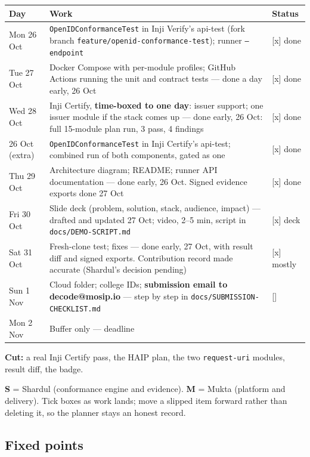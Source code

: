 \documentclass[10pt,a4paper]{article}
\newcommand{\done}{[x]}
\newcommand{\todo}{[\phantom{x}]}
\newcommand{\Sh}{\textbf{S}}
\newcommand{\Mu}{\textbf{M}}
\begin{document}
\begin{longtable}{@{}p{2.2cm}p{11.2cm}p{2.6cm}@{}}
\toprule
Day & Work & Status\\
\midrule
\endhead
Mon 26 Oct & \texttt{OpenIDConformanceTest} in Inji Verify's api-test (fork branch
\texttt{feature/openid-conformance-test}); runner \texttt{--endpoint} & \done{} done\\
Tue 27 Oct & Docker Compose with per-module profiles; GitHub Actions running the unit and
contract tests --- done a day early, 26 Oct & \done{} done\\
Wed 28 Oct & Inji Certify, \textbf{time-boxed to one day}: issuer support; one issuer module
if the stack comes up --- done early, 26 Oct: full 15-module plan run, 3 pass, 4 findings & \done{} done\\
26 Oct (extra) & \texttt{OpenIDConformanceTest} in Inji Certify's api-test; combined run of both
components, gated as one & \done{} done\\
Thu 29 Oct & Architecture diagram; README; runner API documentation --- done early, 26 Oct.
Signed evidence exports done 27 Oct & \done{} done\\
Fri 30 Oct & Slide deck (problem, solution, stack, audience, impact) --- drafted and updated 27 Oct; video, 2--5 min, script in \texttt{docs/DEMO-SCRIPT.md} & \done{} deck\\
Sat 31 Oct & Fresh-clone test; fixes --- done early, 27 Oct, with result diff and signed exports. Contribution record made accurate (Shardul's decision pending) & \done{} mostly\\
Sun 1 Nov & Cloud folder; college IDs; \textbf{submission email to decode@mosip.io} --- step by step in \texttt{docs/SUBMISSION-CHECKLIST.md} & \todo{}\\
Mon 2 Nov & Buffer only --- deadline & \\
\bottomrule
\end{longtable}

\textbf{Cut:} a real Inji Certify pass, the HAIP plan, the two \texttt{request-uri} modules,
result diff, the badge.

\Sh{} = Shardul (conformance engine and evidence). \Mu{} = Mukta (platform and delivery).
Tick boxes as work lands; move a slipped item forward rather than deleting it, so the
planner stays an honest record.

\subsection{Fixed points}
\end{document}
